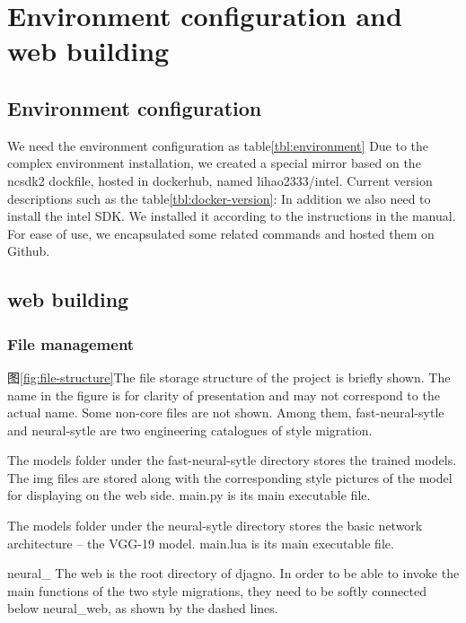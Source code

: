 \section{Environment configuration and web building}
\subsection{Environment configuration}
We need the environment configuration as table\ref{tbl:environment}
Due to the complex environment installation, we created a special mirror based on the ncsdk2 dockfile, hosted in dockerhub, named lihao2333/intel.
Current version descriptions such as the table\ref{tbl:docker-version}:
In addition we also need to install the intel SDK. We installed it according to the instructions in the manual. For ease of use, we encapsulated some related commands and hosted them on Github.\cite{rcClub}
\subsection{web building}
\subsubsection{File management}
图\ref{fig:file-structure}The file storage structure of the project is briefly shown. The name in the figure is for clarity of presentation and may not correspond to the actual name. Some non-core files are not shown.
Among them, fast-neural-sytle and neural-sytle are two engineering catalogues of style migration.

The models folder under the fast-neural-sytle directory stores the trained models. The img files are stored along with the corresponding style pictures of the model for displaying on the web side. main.py is its main executable file.

The models folder under the neural-sytle directory stores the basic network architecture -- the VGG-19 model. main.lua is its main executable file.

neural\_
The web is the root directory of djagno. In order to be able to invoke the main functions of the two style migrations, they need to be softly connected below neural_web, as shown by the dashed lines.

